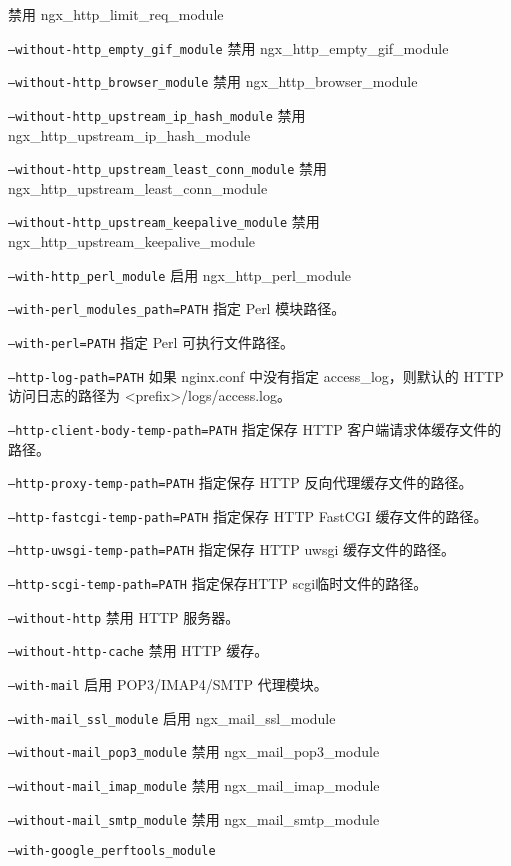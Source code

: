 \begin{compactitem}
禁用 ngx\_http\_limit\_req\_module
\item \texttt{--without-http\_empty\_gif\_module}
禁用 ngx\_http\_empty\_gif\_module
\item \texttt{--without-http\_browser\_module}
禁用 ngx\_http\_browser\_module
\item \texttt{--without-http\_upstream\_ip\_hash\_module}
禁用 ngx\_http\_upstream\_ip\_hash\_module
\item \texttt{--without-http\_upstream\_least\_conn\_module}
禁用 ngx\_http\_upstream\_least\_conn\_module
\item \texttt{--without-http\_upstream\_keepalive\_module}
禁用 ngx\_http\_upstream\_keepalive\_module
\item \texttt{--with-http\_perl\_module}
启用 ngx\_http\_perl\_module
\item \texttt{--with-perl\_modules\_path=PATH}
指定 Perl 模块路径。
\item \texttt{--with-perl=PATH}
指定 Perl 可执行文件路径。
\item \texttt{--http-log-path=PATH}
如果 nginx.conf 中没有指定 access\_log，则默认的 HTTP 访问日志的路径为 <prefix>/logs/access.log。
\item \texttt{--http-client-body-temp-path=PATH}
指定保存 HTTP 客户端请求体缓存文件的路径。
\item \texttt{--http-proxy-temp-path=PATH}
指定保存 HTTP 反向代理缓存文件的路径。
\item \texttt{--http-fastcgi-temp-path=PATH}
指定保存 HTTP FastCGI 缓存文件的路径。
\item \texttt{--http-uwsgi-temp-path=PATH}
指定保存 HTTP uwsgi 缓存文件的路径。
\item \texttt{--http-scgi-temp-path=PATH}
指定保存HTTP scgi临时文件的路径。
\item \texttt{--without-http}
禁用 HTTP 服务器。
\item \texttt{--without-http-cache}
禁用 HTTP 缓存。
\item \texttt{--with-mail}
启用 POP3/IMAP4/SMTP 代理模块。
\item \texttt{--with-mail\_ssl\_module}
启用 ngx\_mail\_ssl\_module
\item \texttt{--without-mail\_pop3\_module}
禁用 ngx\_mail\_pop3\_module
\item \texttt{--without-mail\_imap\_module}
禁用 ngx\_mail\_imap\_module
\item \texttt{--without-mail\_smtp\_module}
禁用 ngx\_mail\_smtp\_module
\item \texttt{--with-google\_perftools\_module}

\end{compactitem}

